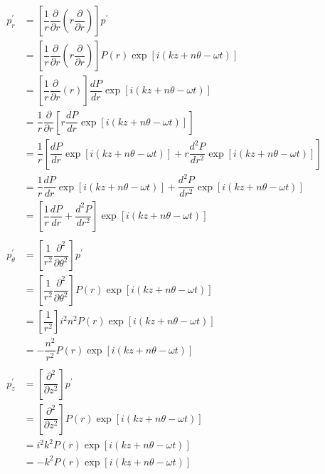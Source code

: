 \documentclass[onecolumn,10pt]{jhwhw}
\begin{document}
\begin{align*}
p^{\prime}_r  &= \left [ \dfrac{1}{r} \dfrac{\partial}{\partial r} \left ( r \dfrac{\partial} {\partial r} \right ) \right ] p^{\prime} \\
&= \left [ \dfrac{1}{r} \dfrac{\partial}{\partial r} \left ( r \dfrac{\partial} {\partial r} \right ) \right ] P(r) \exp[i(kz+n \theta - \omega t)] \\
&= \left [ \dfrac{1}{r} \dfrac{\partial}{\partial r} \left ( r \right ) \right ] \dfrac{d P} {d r} \exp[i(kz+n \theta - \omega t)] \\
&= \dfrac{1}{r} \dfrac{\partial}{\partial r} \left [ r \dfrac{d P} {d r} \exp[i(kz+n \theta - \omega t)]  \right ] \\
&= \dfrac{1}{r} \left [ \dfrac{d P} {d r} \exp[i(kz+n \theta - \omega t)] + r \dfrac{d^2 P} {d r^2} \exp[i(kz+n \theta - \omega t)]  \right ] \\
&= \dfrac{1}{r} \dfrac{d P} {d r} \exp[i(kz+n \theta - \omega t)] + \dfrac{d^2 P} {d r^2} \exp[i(kz+n \theta - \omega t)] \\
&= \left [ \dfrac{1}{r} \dfrac{d P} {d r} + \dfrac{d^2 P} {d r^2} \right ] \exp[i(kz+n \theta - \omega t)] \\
\\
p^{\prime}_{\theta} &= \left [ \dfrac{1}{r^2} \dfrac{\partial ^2}{\partial \theta^2} \right ] p^{\prime} \\
&= \left [ \dfrac{1}{r^2} \dfrac{\partial ^2}{\partial \theta^2} \right ] P(r) \exp[i(kz+n \theta - \omega t)] \\
&= \left [ \dfrac{1}{r^2} \right ] i^2 n^2 P(r) \exp[i(kz+n \theta - \omega t)] \\
&= - \dfrac{n^2}{r^2}  P(r) \exp[i(kz+n \theta - \omega t)] \\
\\
p^{\prime}_z &= \left [ \dfrac{\partial ^2}{\partial z^2} \right ] p^{\prime} \\
&= \left [ \dfrac{\partial ^2}{\partial z^2} \right ] P(r) \exp[i(kz+n \theta - \omega t)] \\
&= i^2k^2 P(r) \exp[i(kz+n \theta - \omega t)] \\
&= -k^2 P(r) \exp[i(kz+n \theta - \omega t)] \\
\end{align*}
\end{document}
